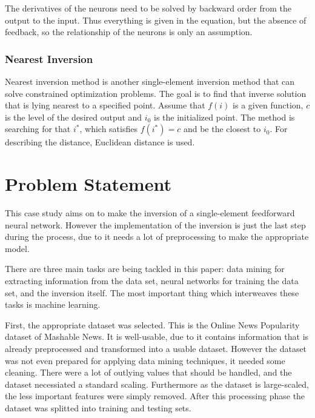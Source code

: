 The derivatives of the neurons need to be solved by backward order from the output to the input. Thus everything is given in the equation, but the absence of feedback, so the relationship of the neurons is only an assumption.



\subsubsection{Nearest Inversion}

Nearest inversion method is another single-element inversion method that can solve constrained optimization problems. The goal is to find that inverse solution that is lying nearest to a specified point. 
Assume that $f(i)$ is a given function, $c$ is the level of the desired output and $i_0$ is the initialized point. The method is searching for that $i^*$, which satisfies $f(i^*) = c$ and be the closest to $i_0$. For describing the distance, Euclidean distance is used.




\section{Problem Statement}

This case study aims on to make the inversion of a single-element feedforward neural network. However the implementation of the inversion is just the last step during the process, due to it needs a lot of preprocessing to make the appropriate model.\smallskip

There are three main tasks are being tackled in this paper: data mining for extracting information from the data set, neural networks for training the data set, and the inversion itself. The most important thing which interweaves these tasks is machine learning.\medskip

First, the appropriate dataset was selected. This is the Online News Popularity dataset of Mashable News. It is well-usable, due to it contains information that is already preprocessed and transformed into a usable dataset. However the dataset was not even prepared for applying data mining techniques, it needed some cleaning. There were a lot of outlying values that should be handled, and the dataset necessiated a standard scaling. Furthermore as the dataset is large-scaled, the less important features were simply removed. After this processing phase the dataset was splitted into training and testing sets.\smallskip


